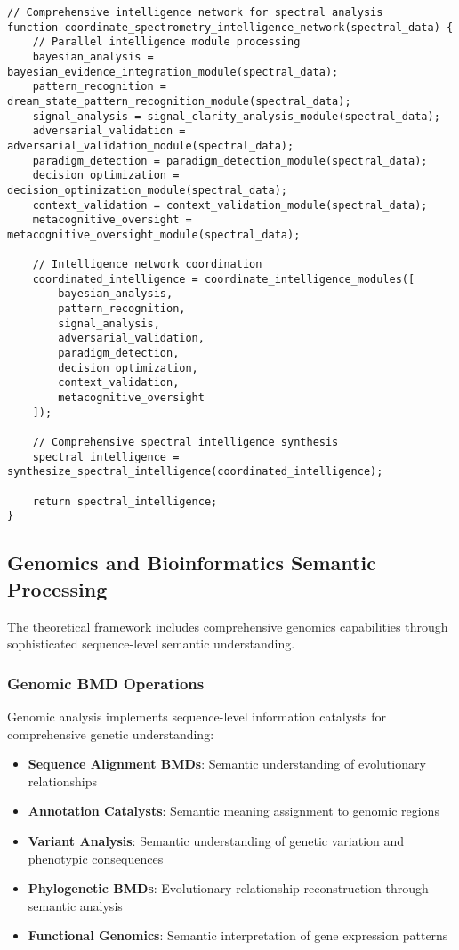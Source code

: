 \documentclass[12pt,a4paper,twoside]{article}
\begin{document}
\begin{lstlisting}[caption=Theoretical Intelligence Network for Spectrometry]
// Comprehensive intelligence network for spectral analysis
function coordinate_spectrometry_intelligence_network(spectral_data) {
    // Parallel intelligence module processing
    bayesian_analysis = bayesian_evidence_integration_module(spectral_data);
    pattern_recognition = dream_state_pattern_recognition_module(spectral_data);
    signal_analysis = signal_clarity_analysis_module(spectral_data);
    adversarial_validation = adversarial_validation_module(spectral_data);
    paradigm_detection = paradigm_detection_module(spectral_data);
    decision_optimization = decision_optimization_module(spectral_data);
    context_validation = context_validation_module(spectral_data);
    metacognitive_oversight = metacognitive_oversight_module(spectral_data);

    // Intelligence network coordination
    coordinated_intelligence = coordinate_intelligence_modules([
        bayesian_analysis,
        pattern_recognition,
        signal_analysis,
        adversarial_validation,
        paradigm_detection,
        decision_optimization,
        context_validation,
        metacognitive_oversight
    ]);

    // Comprehensive spectral intelligence synthesis
    spectral_intelligence = synthesize_spectral_intelligence(coordinated_intelligence);

    return spectral_intelligence;
}
\end{lstlisting}

\subsection{Genomics and Bioinformatics Semantic Processing}

The theoretical framework includes comprehensive genomics capabilities through sophisticated sequence-level semantic understanding.

\subsubsection{Genomic BMD Operations}

Genomic analysis implements sequence-level information catalysts for comprehensive genetic understanding:

\begin{itemize}
\item \textbf{Sequence Alignment BMDs}: Semantic understanding of evolutionary relationships
\item \textbf{Annotation Catalysts}: Semantic meaning assignment to genomic regions
\item \textbf{Variant Analysis}: Semantic understanding of genetic variation and phenotypic consequences
\item \textbf{Phylogenetic BMDs}: Evolutionary relationship reconstruction through semantic analysis
\item \textbf{Functional Genomics}: Semantic interpretation of gene expression patterns
\end{itemize}
\end{document}

